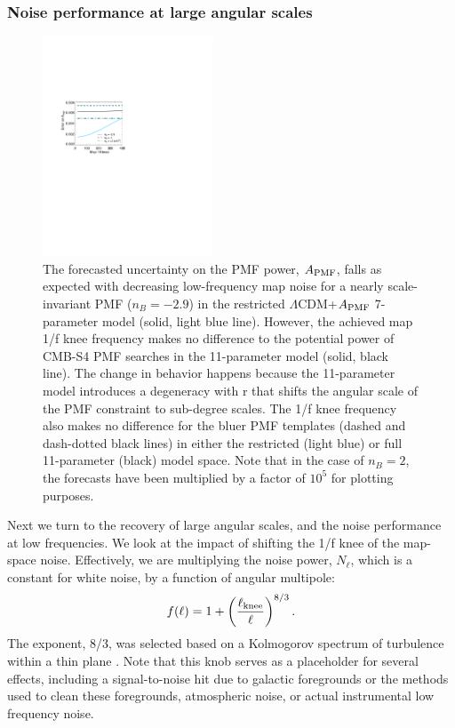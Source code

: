 \documentclass[apj]{emulateapj}
\newcommand{\apmf}{\ensuremath{A_{\rm PMF}}}
\newcommand{\lcdm}{\ensuremath{\Lambda}CDM}
\newcommand{\be}{\begin{equation}}
\newcommand{\ee}{\end{equation}}
\begin{document}
\subsubsection{Noise performance at large angular scales}

\begin{figure}[htb]\centering
\includegraphics[width=0.45\textwidth,clip,trim={2.cm 12.5cm 11cm 7.5cm}]{pmf_knee.pdf}
  \caption[Map knee dependence]{
  The forecasted uncertainty on the PMF power, \apmf{}, falls as expected with decreasing low-frequency map noise for a nearly scale-invariant PMF ($n_B = -2.9$) in the restricted \lcdm{}+\apmf{} 7-parameter model (solid, light blue line). 
  However,  the achieved map 1/f knee frequency makes no difference to the potential power of CMB-S4 PMF searches in the 11-parameter model (solid, black line). 
  The change in behavior happens because the 11-parameter model introduces a degeneracy with r that shifts the angular scale of the PMF constraint to sub-degree scales. 
  The 1/f knee frequency also makes no difference for the bluer PMF templates  (dashed and dash-dotted black lines) in either the restricted (light blue) or full 11-parameter (black) model space. 
     Note that in the case of $n_B=2$, the forecasts have been multiplied by a factor of $10^5$ for plotting purposes. 
    \label{fig:knee}
  }
\end{figure}

Next we turn to the recovery of large angular scales, and the noise performance at low frequencies. 
We look at the impact of shifting the 1/f knee of the map-space noise. 
Effectively, we are multiplying the noise power, $N_\ell$, which is a constant for white noise,  by a function of angular multipole:
\be \label{eqn:knee}
f(\ell) = 1 + \left(\frac{\ell_{\rm knee}}{\ell}\right)^{8/3}.
\ee 
The exponent, 8/3, was selected based on a Kolmogorov spectrum of turbulence within a thin plane \citep{lay00}. %
Note that this knob  serves as a placeholder for several effects, including a signal-to-noise hit due to galactic foregrounds or the methods used to clean these foregrounds, atmospheric noise, or actual instrumental low frequency noise. 
\end{document}
